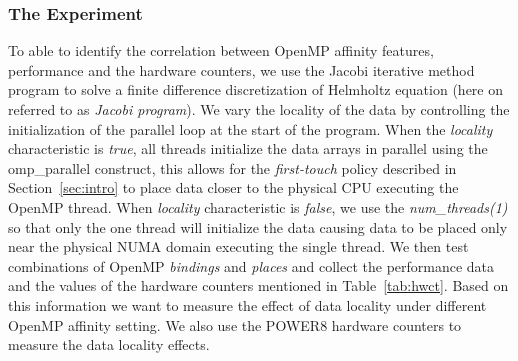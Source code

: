 \subsubsection{The Experiment}
To able to identify the correlation between OpenMP affinity features, performance and the hardware counters, we use the Jacobi iterative method program to solve a 
finite difference discretization of Helmholtz equation (here on referred to as \textit{Jacobi program}). We vary the locality of the data by controlling the initialization of the parallel loop at the start of the program. 
When the \textit{locality} characteristic is \textit{true}, all threads initialize the data arrays in parallel using the omp\_parallel construct, this allows for the 
\textit{first-touch} policy described in Section~\ref{sec:intro} to place data closer to the physical CPU executing the OpenMP thread. 
When \textit{locality} characteristic is \textit{false}, we use the \textit{num\_threads(1)} so that only the one thread will initialize the data causing data to be placed only near the physical NUMA domain executing the single thread. We then test combinations of OpenMP \textit{bindings} and \textit{places} and collect the performance data and the values of the hardware counters mentioned in Table~\ref{tab:hwct}. Based on this information we want to measure the effect of data locality under different OpenMP affinity setting. We also use the POWER8 hardware counters to measure the data locality effects.

